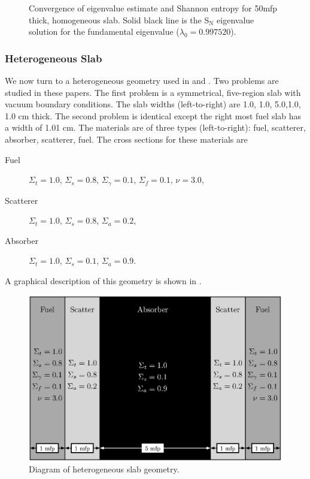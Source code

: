 \begin{figure}[p]\centering

    \caption{Convergence of eigenvalue estimate and Shannon entropy for 50mfp thick, homogeneous slab.  Solid black line is the S$_{\mathrm{N}}$ eigenvalue solution for the fundamental eigenvalue ($\lambda_0 = 0.997520$).}
\end{figure}

\subsubsection{Heterogeneous Slab}
We now turn to a heterogeneous geometry used in \citet{Kornreich:2002Semi--0} and \citet{Ueki:2005Stati-0}.  Two problems are studied in these papers.  The first problem is a symmetrical, five-region slab with vacuum boundary conditions.  The slab widths (left-to-right) are 1.0, 1.0, 5.0,1.0, 1.0 cm thick.  The second problem is identical except the right most fuel slab has a width of 1.01 cm.  The materials are of three types (left-to-right): fuel, scatterer, absorber, scatterer, fuel.   The cross sections for these materials are
\begin{description}
    \item[Fuel] $\Sigma_t = 1.0$, $\Sigma_s = 0.8$, $\Sigma_{\gamma} = 0.1$, $\Sigma_f = 0.1$, $\nu = 3.0$,
    \item[Scatterer] $\Sigma_t = 1.0$, $\Sigma_s = 0.8$, $\Sigma_a = 0.2$,
    \item[Absorber] $\Sigma_t = 1.0$, $\Sigma_s = 0.1$, $\Sigma_a = 0.9$.
\end{description}
A graphical description of this geometry is shown in .

\begin{figure}[ht]\centering
    \includegraphics{EntropyandVariance/Data/MultimediaCartoon}
    \caption{Diagram of heterogeneous slab geometry.}
    \label{fig:HeteroGeometry}
\end{figure}

